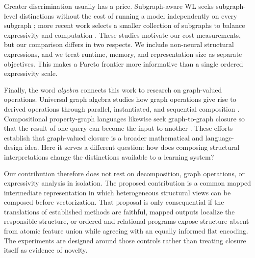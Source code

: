 Greater discrimination usually has a price. Subgraph-aware WL seeks
subgraph-level distinctions without the cost of running a model independently
on every subgraph \cite{Wang2022SubgraphAwareWL}; more recent work selects a
smaller collection of subgraphs to balance expressivity and computation
\cite{Southern2025WalkCentrality}. These studies motivate our cost measurements,
but our comparison differs in two respects. We include non-neural structural
expressions, and we treat runtime, memory, and representation size as separate
objectives. This makes a Pareto frontier more informative than a single ordered
expressivity scale.

Finally, the word \emph{algebra} connects this work to research on graph-valued
operations. Universal graph algebra studies how graph operations give rise to
derived operations through parallel, instantiated, and sequential composition
\cite{Wolter2023GraphAlgebras}. Compositional property-graph languages likewise
seek graph-to-graph closure so that the result of one query can become the
input to another \cite{Arenas2026CompositionalGraphs}. These efforts establish
that graph-valued closure is a broader mathematical and language-design idea.
Here it serves a different question: how does composing structural
interpretations change the distinctions available to a learning system?

Our contribution therefore does not rest on decomposition, graph operations,
or expressivity analysis in isolation. The proposed contribution is a common
mapped intermediate representation in which heterogeneous structural views can
be composed before vectorization. That proposal is only consequential if the
translations of established methods are faithful, mapped outputs localize the
responsible structure, or ordered and relational programs expose structure
absent from atomic feature union while agreeing with an equally informed flat
encoding. The experiments are designed
around those controls rather than treating closure itself as evidence of
novelty.
